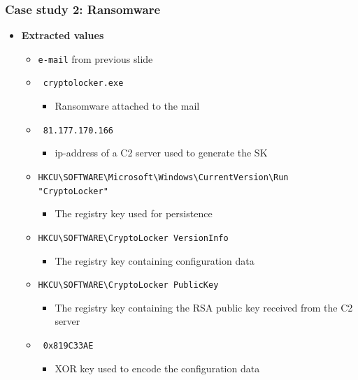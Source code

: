 \begin{frame}[fragile]
    \frametitle{Case study 2: Ransomware}
    \begin{itemize}
        \item[] \textbf{Extracted values}
        \begin{itemize}
            \item \texttt{e-mail} from previous slide
            \item \texttt{\color{black} cryptolocker.exe}
            \begin{itemize}
                \item Ransomware attached to the mail
            \end{itemize}
            \item \texttt{\color{black} 81.177.170.166}
            \begin{itemize}
                \item ip-address of a C2 server used to generate the SK
            \end{itemize}
            \item \lstinline|HKCU\SOFTWARE\Microsoft\Windows\CurrentVersion\Run "CryptoLocker"|
            \begin{itemize}
                \item The registry key used for persistence
            \end{itemize}
            \item \lstinline|HKCU\SOFTWARE\CryptoLocker VersionInfo|
            \begin{itemize}
                \item The registry key containing configuration data
            \end{itemize}
            \item \lstinline|HKCU\SOFTWARE\CryptoLocker PublicKey|
            \begin{itemize}
                \item The registry key containing the RSA public key received from the C2 server
            \end{itemize}
            \item \texttt{\color{black} 0x819C33AE}
            \begin{itemize}
                \item XOR key used to encode the configuration data
            \end{itemize}
        \end{itemize}
    \end{itemize}

\end{frame}

